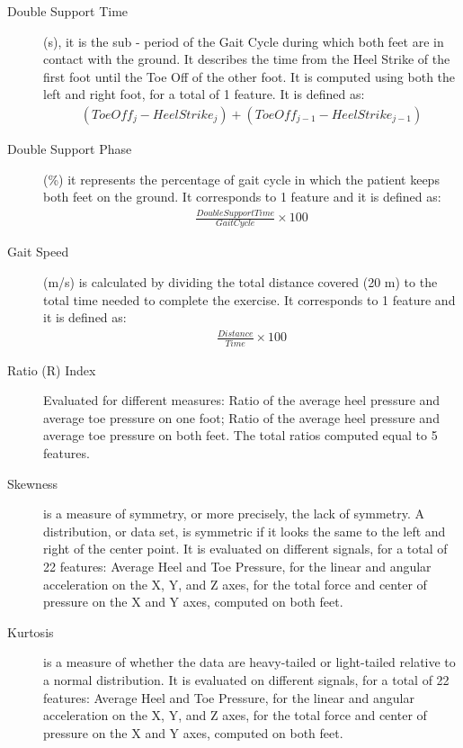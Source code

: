 \begin{description}
\item[Double Support Time] 
(s), it is the sub - period of the Gait Cycle during which both feet are in contact
with the ground. It describes the time from the Heel Strike of the first foot until the Toe Off of the other foot. It is computed using both the left and right foot, for a total of 1 feature. It is defined as:
\begin{equation}
\begin{aligned}
(Toe Off_j - Heel Strike_j) + (Toe Off_{j-1} - Heel Strike_{j-1})
\end{aligned}
\end{equation}

\item[Double Support Phase] (\%) it represents the percentage of gait cycle in which the patient keeps both feet on the ground. It corresponds to 1 feature and it is defined as:
\begin{equation}
\begin{aligned}
\frac{Double Support Time}{Gait Cycle} \times 100
\end{aligned}
\end{equation}


\item[Gait Speed] 
(m/s) is calculated by dividing the total distance covered (20 m) to the total time needed to complete the exercise.  It corresponds to 1 feature and it is defined as:
\begin{equation}
\begin{aligned}
\frac{Distance}{Time} \times 100
\end{aligned}
\end{equation}


\item[Ratio (R) Index] Evaluated for different measures: Ratio of the average heel pressure and average toe pressure on one foot; Ratio of the average heel pressure and average toe pressure on both feet. The total ratios computed equal to 5 features.

\item[Skewness] is a measure of symmetry, or more precisely, the lack of symmetry. A distribution, or data set, is symmetric if it looks the same to the left and right of the center point. It is evaluated on different signals, for a total of 22 features:
Average Heel and Toe Pressure, for the linear and angular acceleration on the X, Y, and Z axes, for the total force and center of pressure on the X and Y axes, computed on both feet.

\item[Kurtosis]  is a measure of whether the data are heavy-tailed or light-tailed relative to a normal distribution. It is evaluated on different signals, for a total of 22 features:
Average Heel and Toe Pressure, for the linear and angular acceleration on the X, Y, and Z axes, for the total force and center of pressure on the X and Y axes, computed on both feet.


\end{description}
